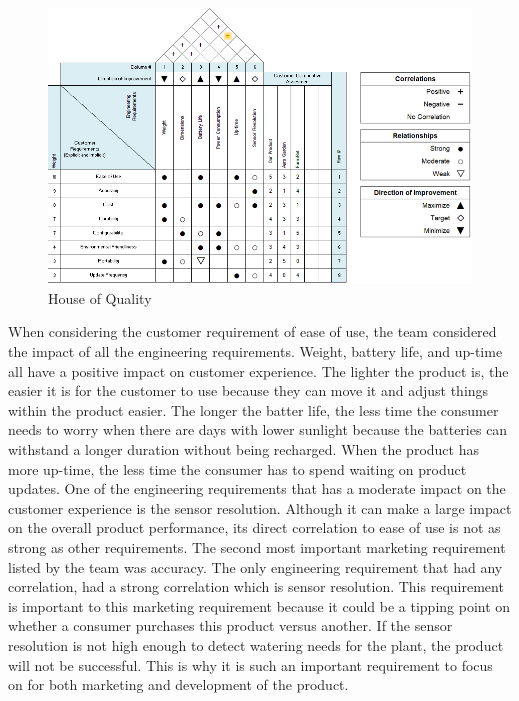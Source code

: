 \begin{figure}[H]
    \centering
    \caption{House of Quality}
    \includegraphics[width=\textwidth]{images/HouseOfQuality.PNG}
\end{figure}

When considering the customer requirement of ease of use, the team considered the impact of all the engineering requirements. Weight, battery life, and up-time all have a positive impact on customer experience. The lighter the product is, the easier it is for the customer to use because they can move it and adjust things within the product easier. The longer the batter life, the less time the consumer needs to worry when there are days with lower sunlight because the batteries can withstand a longer duration without being recharged. When the product has more up-time, the less time the consumer has to spend waiting on product updates. One of the engineering requirements that has a moderate impact on the customer experience is the sensor resolution. Although it can make a large impact on the overall product performance, its direct correlation to ease of use is not as strong as other requirements. The second most important marketing requirement listed by the team was accuracy. The only engineering requirement that had any correlation, had a strong correlation which is sensor resolution. This requirement is important to this marketing requirement because it could be a tipping point on whether a consumer purchases this product versus another. If the sensor resolution is not high enough to detect watering needs for the plant, the product will not be successful. This is why it is such an important requirement to focus on for both marketing and development of the product.\\

